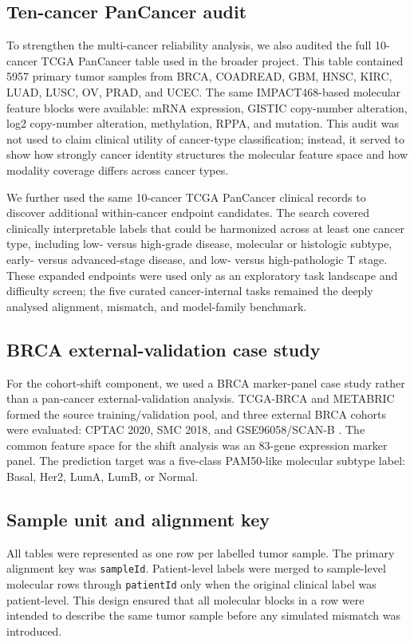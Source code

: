 \subsection{Ten-cancer PanCancer audit}

To strengthen the multi-cancer reliability analysis, we also audited the full 10-cancer TCGA PanCancer table used in the broader project. This table contained 5957 primary tumor samples from BRCA, COADREAD, GBM, HNSC, KIRC, LUAD, LUSC, OV, PRAD, and UCEC. The same IMPACT468-based molecular feature blocks were available: mRNA expression, GISTIC copy-number alteration, log2 copy-number alteration, methylation, RPPA, and mutation. This audit was not used to claim clinical utility of cancer-type classification; instead, it served to show how strongly cancer identity structures the molecular feature space and how modality coverage differs across cancer types.

We further used the same 10-cancer TCGA PanCancer clinical records to discover additional within-cancer endpoint candidates. The search covered clinically interpretable labels that could be harmonized across at least one cancer type, including low- versus high-grade disease, molecular or histologic subtype, early- versus advanced-stage disease, and low- versus high-pathologic T stage. These expanded endpoints were used only as an exploratory task landscape and difficulty screen; the five curated cancer-internal tasks remained the deeply analysed alignment, mismatch, and model-family benchmark.

\subsection{BRCA external-validation case study}

For the cohort-shift component, we used a BRCA marker-panel case study rather than a pan-cancer external-validation analysis. TCGA-BRCA and METABRIC formed the source training/validation pool, and three external BRCA cohorts were evaluated: CPTAC 2020, SMC 2018, and GSE96058/SCAN-B \cite{tcga_brca_2012,curtis_metabric_2012,pereira_metabric_2016,krug_cptac_2020,gse96058}. The common feature space for the shift analysis was an 83-gene expression marker panel. The prediction target was a five-class PAM50-like molecular subtype label: Basal, Her2, LumA, LumB, or Normal.

\subsection{Sample unit and alignment key}

All tables were represented as one row per labelled tumor sample. The primary alignment key was \texttt{sampleId}. Patient-level labels were merged to sample-level molecular rows through \texttt{patientId} only when the original clinical label was patient-level. This design ensured that all molecular blocks in a row were intended to describe the same tumor sample before any simulated mismatch was introduced.
